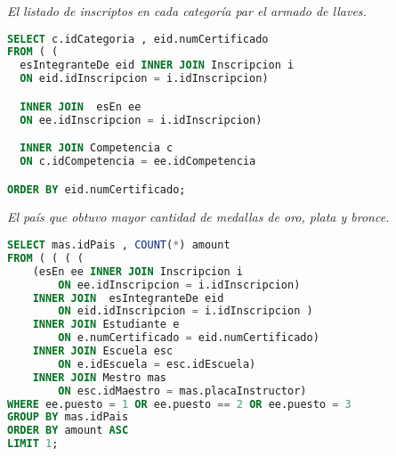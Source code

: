 

\emph{El listado de inscriptos en cada categoría par el armado de llaves.}
\begin{lstlisting}[language=SQL]
SELECT c.idCategoria , eid.numCertificado
FROM ( (
  esIntegranteDe eid INNER JOIN Inscripcion i
  ON eid.idInscripcion = i.idInscripcion)

  INNER JOIN  esEn ee
  ON ee.idInscripcion = i.idInscripcion)

  INNER JOIN Competencia c
  ON c.idCompetencia = ee.idCompetencia

ORDER BY eid.numCertificado;
\end{lstlisting}

\emph{El país que obtuvo mayor cantidad de medallas de oro, plata y bronce.}
\begin{lstlisting}[language=SQL]
SELECT mas.idPais , COUNT(*) amount
FROM ( ( ( (
    (esEn ee INNER JOIN Inscripcion i
        ON ee.idInscripcion = i.idInscripcion)
    INNER JOIN  esIntegranteDe eid
        ON eid.idInscripcion = i.idInscripcion )
    INNER JOIN Estudiante e
        ON e.numCertificado = eid.numCertificado)
    INNER JOIN Escuela esc
        ON e.idEscuela = esc.idEscuela)
    INNER JOIN Mestro mas
        ON esc.idMaestro = mas.placaInstructor)
WHERE ee.puesto = 1 OR ee.puesto == 2 OR ee.puesto = 3
GROUP BY mas.idPais
ORDER BY amount ASC
LIMIT 1;
\end{lstlisting}


